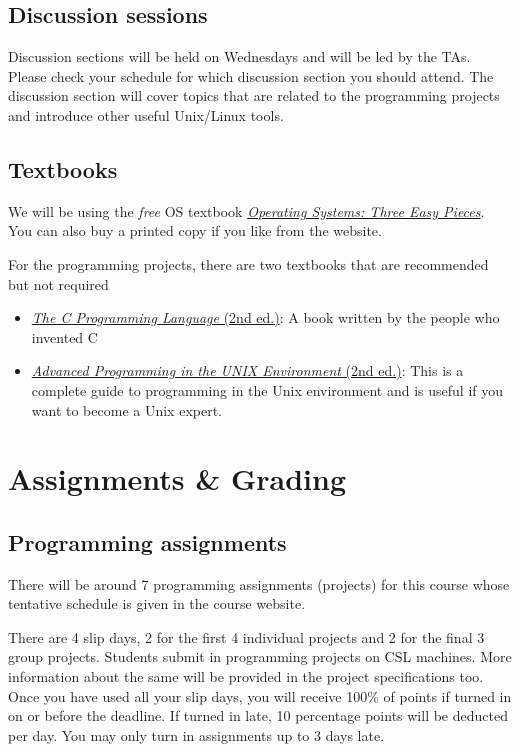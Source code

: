 \subsection*{Discussion sessions}
Discussion sections will be held on Wednesdays and will be led by the TAs. Please check your schedule for which
discussion section you should attend. The discussion section will cover topics that are related to the programming
projects and introduce other useful Unix/Linux tools.

\subsection*{Textbooks}

We will be using the \emph{free} OS textbook
\href{https://pages.cs.wisc.edu/~remzi/OSTEP}{\emph{Operating Systems: Three Easy
Pieces}}. You can also buy a printed copy if you like from the website.

For the programming projects, there are two textbooks that are recommended but not required
\begin{itemize}
\item \href{https://a.co/d/6cQipwF}{\emph{The C Programming Language} (2nd
ed.)}: A book written by the people who invented C
\item \href{https://a.co/d/9mCa0Gb}{\emph{Advanced Programming in the UNIX
Environment} (2nd ed.)}: This is a complete guide to programming in the Unix
environment and is useful if you want to become a Unix expert.
        \end{itemize}

\section*{Assignments \& Grading}

\subsection*{Programming assignments}

There will be around 7 programming assignments (projects) for this course whose
tentative schedule is given in the course website.

There are 4 slip days, 2 for the first 4 individual projects and 2 for the final
3 group projects. Students submit in programming projects on CSL machines. More
information about the same will be provided in the project specifications too.
Once you have used all your slip days, you will receive 100\% of points if turned
in on or before the deadline. If turned in late, 10 percentage points will be
deducted per day. You may only turn in assignments up to 3 days late.

